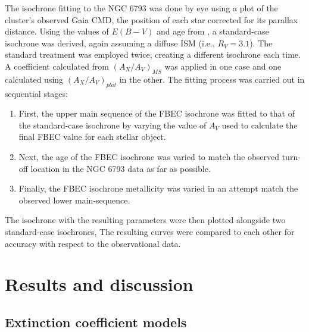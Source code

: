 \documentclass[12pt, a4paper]{report}
\begin{document}
The isochrone fitting to the NGC 6793 was done by eye using a plot of the cluster's observed Gaia CMD, the position of each star corrected for its parallax distance. Using the values of $E(B-V)$ and age from \cite{2018A&A...616A..10G}, a standard-case isochrone was derived, again assuming a diffuse ISM (i.e., $R_{V} = 3.1$). The standard treatment was employed twice, creating a different isochrone each time. A coefficient calculated from $(A_{X}/A_{V})_{MS}$ was applied in one case and one calculated using $(A_{X}/A_{V})_{plat}$ in the other. The fitting process was carried out in sequential stages:

\begin{enumerate}
\item First, the upper main sequence of the FBEC isochrone was fitted to that of the standard-case isochrone by varying the value of $A_{V}$ used to calculate the final FBEC value for each stellar object.
\item Next, the age of the FBEC isochrone was varied to match the observed turn-off location in the NGC 6793 data as far as possible.
\item Finally, the FBEC isochrone metallicity was varied in an attempt match the observed lower main-sequence.
\end{enumerate}

The isochrone with the resulting parameters were then plotted alongside two standard-case isochrones, The resulting curves were compared to each other for accuracy with respect to the observational data.


\chapter{Results and discussion}
\section{Extinction coefficient models} \label{coef_models}
\end{document}
